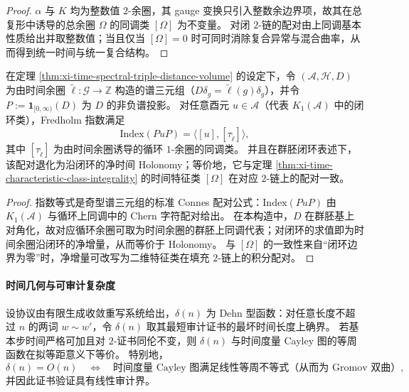 \begin{proof}
\(\alpha\) 与 \(K\) 均为整数值 \(2\)-余圈，其 gauge 变换只引入整数余边界项，故其在总复形中诱导的总余圈 \(\Omega\) 的同调类 \([\Omega]\) 为不变量。
对闭 \(2\)-链的配对由上同调基本性质给出并取整数值；当且仅当 \([\Omega]=0\) 时可同时消除复合异常与混合曲率，从而得到统一时间与统一复合结构。
\end{proof}

\begin{theorem}\label{thm:xi-time-index-theorem-k1-holonomy}
在定理 \ref{thm:xi-time-spectral-triple-distance-volume} 的设定下，令 \((\mathcal A,\mathcal H,D)\) 为由时间余圈 \(\widetilde\ell:\mathcal G\to\mathbb Z\) 构造的谱三元组（\(D\delta_g=\widetilde\ell(g)\delta_g\)），并令 \(P:=\mathbf 1_{[0,\infty)}(D)\) 为 \(D\) 的非负谱投影。
对任意酉元 \(u\in\mathcal A\)（代表 \(K_1(\mathcal A)\) 中的闭环类），Fredholm 指数满足
\[
\mathrm{Index}(PuP)=\langle [u],[\tau_{\widetilde\ell}]\rangle,
\]
其中 \([\tau_{\widetilde\ell}]\) 为由时间余圈诱导的循环 \(1\)-余圈的同调类。
并且在群胚闭环表述下，该配对退化为沿闭环的净时间 Holonomy；等价地，它与定理 \ref{thm:xi-time-characteristic-class-integrality} 的时间特征类 \([\Omega]\) 在对应 \(2\)-链上的配对一致。
\end{theorem}

\begin{proof}
指数等式是奇型谱三元组的标准 Connes 配对公式：\(\mathrm{Index}(PuP)\) 由 \(K_1(\mathcal A)\) 与循环上同调中的 Chern 字符配对给出。
在本构造中，\(D\) 在群胚基上对角化，故对应循环余圈可取为时间余圈的群胚上同调代表；对闭环的求值即为时间余圈沿闭环的净增量，从而等价于 Holonomy。
与 \([\Omega]\) 的一致性来自“闭环边界为零”时，净增量可改写为二维特征类在填充 \(2\)-链上的积分配对。
\end{proof}

\paragraph{时间几何与可审计复杂度}

\begin{theorem}\label{thm:xi-audit-dehn-function-time-geometry}
设协议由有限生成收敛重写系统给出，\(\delta(n)\) 为 Dehn 型函数：对任意长度不超过 \(n\) 的两词 \(w\sim w'\)，令 \(\delta(n)\) 取其最短审计证书的最坏时间长度上确界。
若基本步时间严格可加且对 \(2\)-证书同伦不变，则 \(\delta(n)\) 与时间度量 Cayley 图的等周函数在拟等距意义下等价。
特别地，
\[
\delta(n)=O(n)
\quad\Longleftrightarrow\quad
\text{时间度量 Cayley 图满足线性等周不等式（从而为 Gromov 双曲）},
\]
并因此证书验证具有线性审计界。
\end{theorem}

